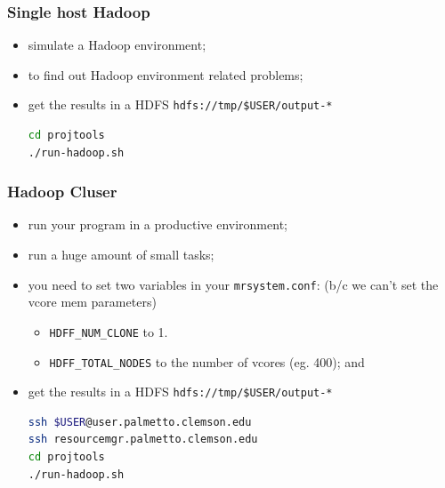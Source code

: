 \documentclass{beamer}
\theoremstyle{definition}
\theoremstyle{remark}
\begin{document}
\begin{frame}[fragile]
  \frametitle<presentation>{Single host Hadoop}

    \begin{itemize}
      \item simulate a Hadoop environment;
      \item to find out Hadoop environment related problems;

      \item get the results in a HDFS \texttt{hdfs://tmp/\${USER}/output-*}
\begin{lstlisting}[language=bash]
cd projtools
./run-hadoop.sh
\end{lstlisting}
    \end{itemize}

\end{frame}



\begin{frame}[fragile]
  \frametitle<presentation>{Hadoop Cluser}

    \begin{itemize}
      \item run your program in a productive environment;
      \item run a huge amount of small tasks;
      \item you need to set two variables in your \texttt{mrsystem.conf}: (b/c we can't set the vcore mem parameters)
        \begin{itemize}
          \item \texttt{HDFF\_NUM\_CLONE} to 1.
          \item \texttt{HDFF\_TOTAL\_NODES} to the number of vcores (eg. 400); and
        \end{itemize}

      \item get the results in a HDFS \texttt{hdfs://tmp/\${USER}/output-*}
\begin{lstlisting}[language=bash]
ssh $USER@user.palmetto.clemson.edu
ssh resourcemgr.palmetto.clemson.edu
cd projtools
./run-hadoop.sh
\end{lstlisting}
    \end{itemize}

\end{frame}
\end{document}
